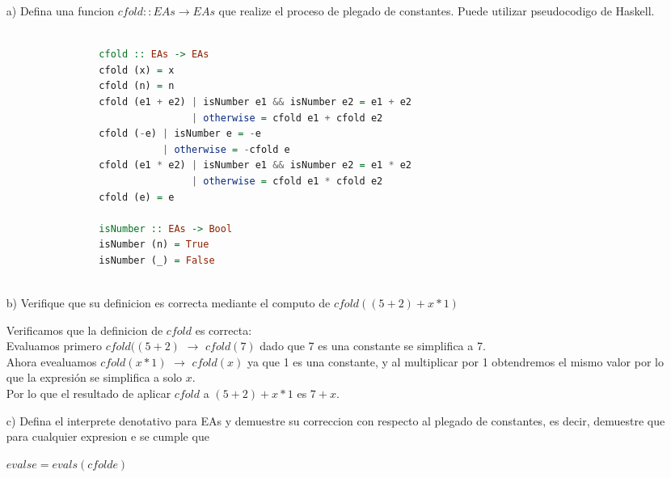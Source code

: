 \documentclass{article}
\begin{document}
\begin{itemize}
            \begin{itemize}
                \item[a)] Defina una funcion $cfold :: EAs \rightarrow EAs$ que realize el proceso de plegado de constantes. Puede utilizar pseudocodigo de Haskell.

                \begin{lstlisting}[language=Haskell]

                cfold :: EAs -> EAs
                cfold (x) = x
                cfold (n) = n
                cfold (e1 + e2) | isNumber e1 && isNumber e2 = e1 + e2
                                | otherwise = cfold e1 + cfold e2
                cfold (-e) | isNumber e = -e
                           | otherwise = -cfold e
                cfold (e1 * e2) | isNumber e1 && isNumber e2 = e1 * e2
                                | otherwise = cfold e1 * cfold e2
                cfold (e) = e

                isNumber :: EAs -> Bool
                isNumber (n) = True
                isNumber (_) = False
                
                \end{lstlisting}

                \item[b)] Verifique que su definicion es correcta mediante el computo de $cfold((5 + 2) + x * 1)$

                Verificamos que la definicion de $cfold$ es correcta:\\
                Evaluamos primero $cfold((5 + 2)$ $\rightarrow$ $cfold(7)$ dado que 7 es una constante se simplifica a 7.\\

                Ahora evealuamos $cfold(x * 1)$ $\rightarrow$ $cfold(x)$ ya que 1 es una constante, y al multiplicar por 1 obtendremos el mismo valor por lo que la expresión se simplifica a solo $x$.\\

                Por lo que el resultado de aplicar $cfold$ a $(5 + 2) + x * 1$ es $7 + x$.\\
                
                \item[c)] Defina el interprete denotativo para EAs y demuestre su correccion con respecto al plegado de constantes, es decir, demuestre que para cualquier expresion e se cumple que
                    \begin{center}
                        $eval s e = eval s (cfold e)$
                    \end{center}


\end{itemize}
\end{itemize}
\end{document}
